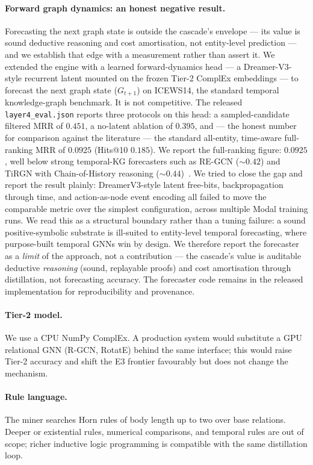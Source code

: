 \documentclass[11pt]{article}
\theoremstyle{plain}
\begin{document}
\paragraph{Forward graph dynamics: an honest negative result.}
\label{sec:layer4}
Forecasting the next graph state is outside the cascade's envelope --- its
value is sound deductive reasoning and cost amortisation, not entity-level
prediction --- and we establish that edge with a measurement rather than
assert it. We extended the engine with a learned forward-dynamics head ---
a Dreamer-V3-style recurrent latent mounted on the frozen Tier-2 ComplEx
embeddings --- to forecast the next graph state ($G_{t+1}$) on ICEWS14, the
standard temporal knowledge-graph benchmark. It is not competitive. The
released \texttt{layer4\_eval.json} reports three protocols on this head: a
sampled-candidate filtered MRR of $0.451$, a no-latent ablation of $0.395$,
and --- the honest number for comparison against the literature --- the
standard all-entity, time-aware full-ranking MRR of $0.0925$ (Hits@10
$0.185$). We report the full-ranking figure: $0.0925$, well below strong
temporal-KG forecasters such as RE-GCN ($\sim$$0.42$) and TiRGN with
Chain-of-History reasoning ($\sim$$0.44$)~\citep{chainhistory2024}. We tried
to close the gap and
report the result plainly: DreamerV3-style latent free-bits, backpropagation
through time, and action-as-node event encoding all failed to move the
comparable metric over the simplest configuration, across multiple Modal
training runs. We read this as a structural boundary rather than a tuning
failure: a sound positive-symbolic substrate is ill-suited to entity-level
temporal forecasting, where purpose-built temporal GNNs win by design. We
therefore report the forecaster as a \emph{limit} of the approach, not a
contribution --- the cascade's value is auditable deductive \emph{reasoning}
(sound, replayable proofs) and cost amortisation through distillation, not
forecasting accuracy. The forecaster code remains in the released
implementation for reproducibility and provenance.

\paragraph{Tier-2 model.} We use a CPU NumPy ComplEx. A production system
would substitute a GPU relational GNN (R-GCN, RotatE) behind the same
interface; this would raise Tier-2 accuracy and shift the E3 frontier
favourably but does not change the mechanism.

\paragraph{Rule language.} The miner searches Horn rules of body length up
to two over base relations. Deeper or existential rules, numerical
comparisons, and temporal rules are out of scope; richer inductive logic
programming is compatible with the same distillation loop.
\end{document}
